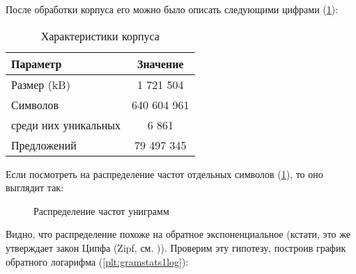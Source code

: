 После обработки корпуса его можно было описать следующими цифрами (\cref{table:corpora}):

\begin{table}[H]
	\begin{center}
\begin{tabular}{|l|c|} \hline
	Параметр & Значение \\ \hline 
	Размер (kB) & 1 721 504 \\
	Символов & 640 604 961 \\
	среди них уникальных & 6 861 \\
	Предложений & 79 497 345	\\  \hline
\end{tabular}
\caption{Характеристики корпуса}
\label{table:corpora}
\end{center}
\end{table}
 
\vspace{20pt}

Если посмотреть на распределение частот отдельных символов (\cref{plt:gramstats1_all}), то оно выглядит так:

\begin{center}

\begin{figure}[H]
\caption{Распределение частот униграмм}
\label{plt:gramstats1_all}
\end{figure}
\end{center}


Видно, что распределение похоже на обратное экспоненциальное (кстати, это же утверждает закон Ципфа (Zipf, см. \cite{manning})). Проверим эту гипотезу, построив график обратного логарифма (\cref{plt:gramstats1log}):

